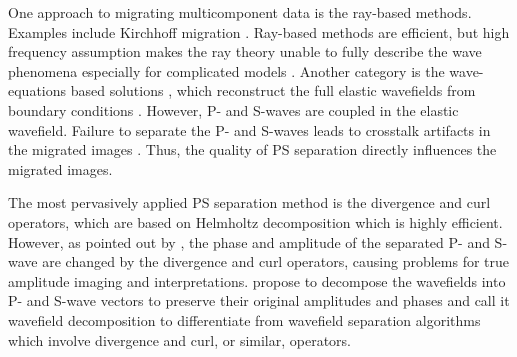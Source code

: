 \documentclass[manuscript,ulem,graphix,revised]{geophysics}
\begin{document}

One approach to migrating multicomponent data is the ray-based methods. Examples include Kirchhoff migration \citep{kuo84, dai86, hokstad00}.
Ray-based methods are efficient, but high frequency assumption makes the ray theory unable to fully describe the wave phenomena especially for complicated models \citep{gray01}.
Another category is the wave-equations based solutions \citep{chang86,chang94,whitmore95}, which reconstruct the full elastic wavefields from boundary conditions \citep{wapenaar90}. 
However, P- and S-waves are coupled in the elastic wavefield. Failure to separate the P- and S-waves leads to crosstalk artifacts in the migrated images \citep{yan08}. Thus, the quality of PS separation directly influences the migrated images. 

The most pervasively applied PS separation method is the divergence and curl operators, which are based on Helmholtz decomposition \citep{aki80} which is highly efficient. However, as pointed out by \citet{sun01}, the phase and amplitude of the separated P- and S-wave are changed by the divergence and curl operators, causing problems for true amplitude imaging and interpretations.
\citet{zhang10} propose to decompose the wavefields into P- and S-wave vectors to preserve their original amplitudes and phases and call it wavefield decomposition to differentiate from wavefield separation algorithms which involve divergence and curl, or similar, operators. 
\end{document}
